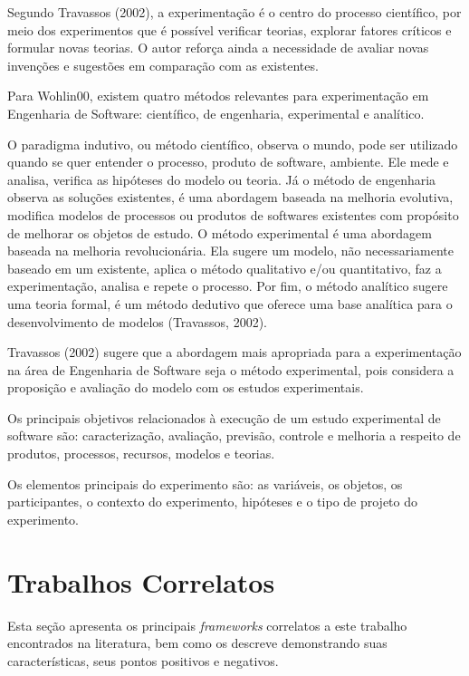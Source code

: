 Segundo Travassos (2002), a experimentação é o centro do processo científico, por meio dos experimentos que é possível verificar teorias, explorar fatores críticos e formular novas teorias. O autor reforça ainda a necessidade de avaliar novas invenções e sugestões em comparação com as existentes.

Para Wohlin00, existem quatro métodos relevantes para experimentação em Engenharia de Software: científico, de engenharia, experimental e analítico. 

O paradigma indutivo, ou método científico, observa o mundo, pode ser utilizado quando se quer entender o processo, produto de software, ambiente. Ele mede e analisa, verifica as hipóteses do modelo ou teoria.  Já o método de engenharia observa as soluções existentes, é uma abordagem baseada na melhoria evolutiva, modifica modelos de processos ou produtos de softwares existentes com propósito de melhorar os objetos de estudo. O método experimental é uma abordagem baseada na melhoria revolucionária. Ela sugere um modelo, não necessariamente baseado em um existente, aplica o método qualitativo e/ou quantitativo, faz a experimentação, analisa e repete o processo. Por fim, o método analítico sugere uma teoria formal, é um método dedutivo que oferece uma base analítica para o desenvolvimento de modelos (Travassos, 2002).

Travassos (2002) sugere que a abordagem mais apropriada para a experimentação na área de Engenharia de Software seja o método experimental, pois considera a proposição e avaliação do modelo com os estudos experimentais.

Os principais objetivos relacionados à execução de um estudo experimental de software são: caracterização, avaliação, previsão, controle e melhoria a respeito de produtos, processos, recursos, modelos e teorias.

Os elementos principais do experimento são: as variáveis, os objetos, os participantes, o contexto do experimento, hipóteses e o tipo de projeto do experimento.

\section{Trabalhos Correlatos}

\noindent Esta seção apresenta os principais \textit{frameworks} correlatos a este trabalho encontrados na literatura, bem como os descreve  demonstrando suas características, seus pontos positivos e negativos.



